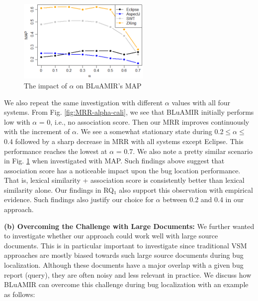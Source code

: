 \documentclass[sigconf,review,anonymous]{acmart}
\begin{document}
\begin{figure}[!t]
	\centering
	\includegraphics[width=2.5in]{alpha-calibration-map}
	\vspace{-.3cm}
	\caption{The impact of $\alpha$ on BLuAMIR's MAP}
	\label{fig:MAP-alpha-cali}
\end{figure}
We also repeat the same investigation with different $\alpha$ values with all four systems. From Fig. \ref{fig:MRR-alpha-cali}, we see that BLuAMIR initially performs low with $\alpha$ = 0, i.e., no association score. Then our MRR improves continuously with the increment of $\alpha$. We see a somewhat stationary state during 0.2$\le\alpha\le$0.4 followed by a sharp decrease in MRR with all systems except Eclipse.
This performance reaches the lowest at $\alpha$ = 0.7.
We also note a pretty similar scenario in Fig. \ref{fig:MAP-alpha-cali} when investigated with MAP.
Such findings above suggest that association score has a noticeable impact upon the bug location performance. That is, lexical similarity + association score is consistently better than lexical similarity alone. Our findings in RQ$_1$ also support this observation with empirical evidence. Such findings also justify our choice for $\alpha$ between 0.2 and 0.4 in our approach. 

\textbf{(b) Overcoming the Challenge with Large Documents:}
We further wanted to investigate whether our approach could work well with large source documents. This is in particular important to investigate since traditional VSM approaches are mostly biased towards such large source documents during bug localization. 
Although these documents have a major overlap with a given bug report (query), they are often noisy and less relevant in practice. We discuss how BLuAMIR can overcome this challenge during bug localization with an example as follows:
\end{document}
